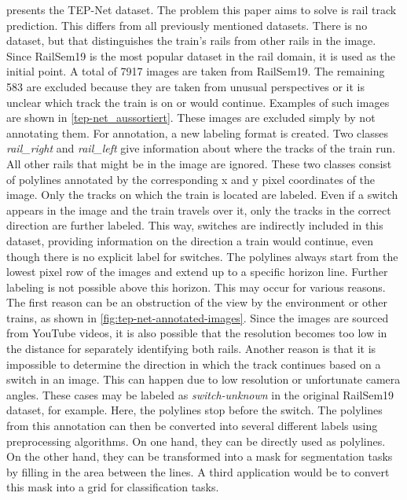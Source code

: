 \cite{tepNet2024} presents the \ac{TEP}-Net dataset.
The problem this paper aims to solve is rail track prediction.
This differs from all previously mentioned datasets.
There is no dataset, but \cite{tepNet2024} that distinguishes the train's rails from other rails in the image.
Since RailSem19 is the most popular dataset in the rail domain, it is used as the initial point.
A total of 7917 images are taken from RailSem19.
The remaining 583 are excluded because they are taken from unusual perspectives or it is unclear which track the train is on or would continue.
Examples of such images are shown in \autoref{tep-net_aussortiert}.
These images are excluded simply by not annotating them.
For annotation, a new labeling format is created.
Two classes \textit{rail\_right} and \textit{rail\_left} give information about where the tracks of the train run.
All other rails that might be in the image are ignored.
These two classes consist of polylines annotated by the corresponding x and y pixel coordinates of the image.
Only the tracks on which the train is located are labeled.
Even if a switch appears in the image and the train travels over it, only the tracks in the correct direction are further labeled.
This way, switches are indirectly included in this dataset, providing information on the direction a train would continue, even though there is no explicit label for switches.
The polylines always start from the lowest pixel row of the images and extend up to a specific horizon line.
Further labeling is not possible above this horizon.
This may occur for various reasons.
The first reason can be an obstruction of the view by the environment or other trains, as shown in \autoref{fig:tep-net-annotated-images}.
Since the images are sourced from YouTube videos, it is also possible that the resolution becomes too low in the distance for separately identifying both rails.
Another reason is that it is impossible to determine the direction in which the track continues based on a switch in an image.
This can happen due to low resolution or unfortunate camera angles.
These cases may be labeled as \textit{switch-unknown} in the original RailSem19 dataset, for example.
Here, the polylines stop before the switch.
The polylines from this annotation can then be converted into several different labels using preprocessing algorithms.
On one hand, they can be directly used as polylines.
On the other hand, they can be transformed into a mask for segmentation tasks by filling in the area between the lines.
A third application would be to convert this mask into a grid for classification tasks.

